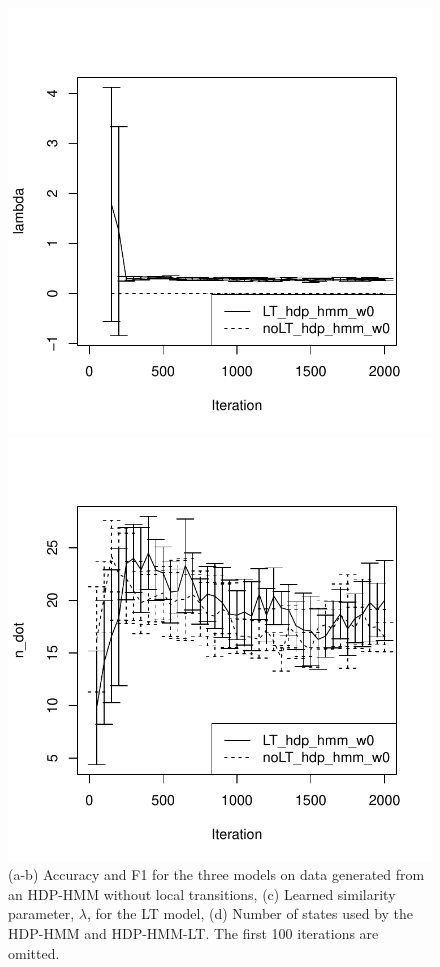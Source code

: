 \begin{figure}[tb]
\vspace{-0.3in}

  \begin{minipage}{0.40\textwidth}
  \includegraphics[width = \textwidth]{fig/synth16/w0/noLT_s0/lambda.pdf}
\end{minipage}
  \begin{minipage}{0.40\textwidth}
  \includegraphics[width = \textwidth]{fig/synth16/w0/noLT_s0/n_dot.pdf}
\end{minipage}
  \caption{(a-b) Accuracy and F1 for the three models on data generated 
    from an HDP-HMM without local transitions, (c) Learned similarity
    parameter, $\lambda$,
  for the LT model, (d) Number of states used by
  the HDP-HMM and HDP-HMM-LT.  The first 100 iterations are omitted.}
  \label{fig:synthetic-results}
\end{figure}
